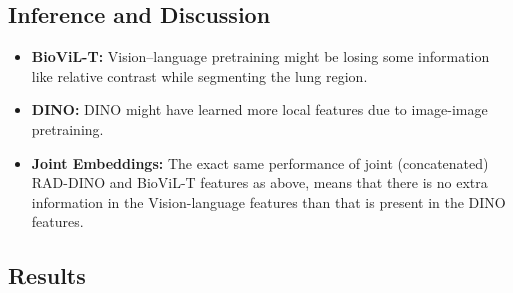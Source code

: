 \subsection{Inference and Discussion}
\begin{itemize}

  \item \textbf{BioViL-T:} Vision--language pretraining might be losing some information like relative contrast 
  while segmenting the lung region.

  \item \textbf{DINO:} DINO might have learned more local features due to image-image pretraining. 

  \item \textbf{Joint Embeddings:} The exact same performance of joint (concatenated) RAD-DINO and BioViL-T features as above, means that 
  there is no extra information in the Vision-language features than that is present in the DINO features.

\end{itemize}

\subsection{Results}






